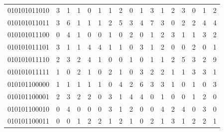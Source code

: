 \documentclass[10pt,a4paper]{article}
\begin{document}
\begin{longtable}{ |c|c|c|c|c|c|c|c|c|c|c|c|c|c|c|c|c| }
    010101011010              & 3                            & 1                                & 1                            & 0                              & 1   & 1   & 2   & 0   & 1   & 3   & 1   & 2   & 3   & 0   & 1   & 2   \\
    010101011011              & 3                            & 6                                & 1                            & 1                              & 1   & 2   & 5   & 3   & 4   & 7   & 3   & 0   & 2   & 2   & 4   & 4   \\
    010101011100              & 0                            & 4                                & 1                            & 0                              & 0   & 1   & 0   & 2   & 0   & 1   & 2   & 3   & 1   & 1   & 3   & 2   \\
    010101011101              & 3                            & 1                                & 1                            & 4                              & 4   & 1   & 1   & 0   & 3   & 1   & 2   & 0   & 0   & 2   & 0   & 1   \\
    010101011110              & 2                            & 3                                & 2                            & 4                              & 1   & 0   & 0   & 1   & 0   & 1   & 1   & 2   & 5   & 3   & 2   & 9   \\
    010101011111              & 1                            & 0                                & 2                            & 1                              & 0   & 2   & 1   & 0   & 3   & 2   & 2   & 1   & 1   & 3   & 3   & 1   \\
    010101100000              & 1                            & 1                                & 1                            & 1                              & 1   & 0   & 4   & 2   & 6   & 3   & 3   & 1   & 0   & 1   & 0   & 3   \\
    010101100001              & 2                            & 3                                & 2                            & 2                              & 0   & 3   & 1   & 4   & 4   & 0   & 1   & 0   & 0   & 1   & 2   & 0   \\
    010101100010              & 0                            & 4                                & 0                            & 0                              & 0   & 3   & 1   & 2   & 0   & 0   & 4   & 2   & 4   & 0   & 3   & 0   \\
    010101100011              & 0                            & 0                                & 1                            & 2                              & 2   & 1   & 2   & 1   & 0   & 2   & 1   & 3   & 1   & 2   & 2   & 1   \\

\end{longtable}
\end{document}
